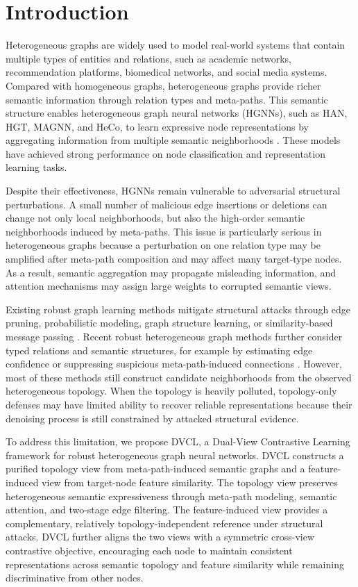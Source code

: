 ﻿\section{Introduction}

Heterogeneous graphs are widely used to model real-world systems that contain multiple types of entities and relations, such as academic networks, recommendation platforms, biomedical networks, and social media systems. Compared with homogeneous graphs, heterogeneous graphs provide richer semantic information through relation types and meta-paths. This semantic structure enables heterogeneous graph neural networks (HGNNs), such as HAN, HGT, MAGNN, and HeCo, to learn expressive node representations by aggregating information from multiple semantic neighborhoods \cite{wang2019han,hu2020hgt,fu2020magnn,wang2021heco}. These models have achieved strong performance on node classification and representation learning tasks.

Despite their effectiveness, HGNNs remain vulnerable to adversarial structural perturbations. A small number of malicious edge insertions or deletions can change not only local neighborhoods, but also the high-order semantic neighborhoods induced by meta-paths. This issue is particularly serious in heterogeneous graphs because a perturbation on one relation type may be amplified after meta-path composition and may affect many target-type nodes. As a result, semantic aggregation may propagate misleading information, and attention mechanisms may assign large weights to corrupted semantic views.

Existing robust graph learning methods mitigate structural attacks through edge pruning, probabilistic modeling, graph structure learning, or similarity-based message passing \cite{wu2019gcnjaccard,zhu2019rgcn,jin2020prognn,zhang2020gnnguard,jin2021simpgcn}. Recent robust heterogeneous graph methods further consider typed relations and semantic structures, for example by estimating edge confidence or suppressing suspicious meta-path-induced connections \cite{rohe,hseco,heteguard}. However, most of these methods still construct candidate neighborhoods from the observed heterogeneous topology. When the topology is heavily polluted, topology-only defenses may have limited ability to recover reliable representations because their denoising process is still constrained by attacked structural evidence.

To address this limitation, we propose DVCL, a Dual-View Contrastive Learning framework for robust heterogeneous graph neural networks. DVCL constructs a purified topology view from meta-path-induced semantic graphs and a feature-induced view from target-node feature similarity. The topology view preserves heterogeneous semantic expressiveness through meta-path modeling, semantic attention, and two-stage edge filtering. The feature-induced view provides a complementary, relatively topology-independent reference under structural attacks. DVCL further aligns the two views with a symmetric cross-view contrastive objective, encouraging each node to maintain consistent representations across semantic topology and feature similarity while remaining discriminative from other nodes.

